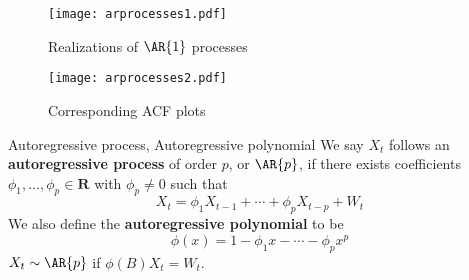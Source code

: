 \begin{figure}[!htbp]
    \centering
    \texttt{[image: arprocesses1.pdf]}
    \caption{Realizations of $ \AR{1} $ processes}\label{fig:arprocesses1}
\end{figure}
\begin{figure}[!htbp]
    \centering
    \texttt{[image: arprocesses2.pdf]}
    \caption{Corresponding ACF plots}\label{fig:arprocesses2}
\end{figure}
\begin{Definition}{Autoregressive process, Autoregressive polynomial}{}
    We say $ X_t $ follows an \textbf{autoregressive process} of order $ p $,
    or $ \AR{p} $,
    if there exists coefficients $ \phi_1,\ldots,\phi_p\in\mathbf{R} $
    with $ \phi_p\ne 0 $ such that
    \[ X_t=\phi_1X_{t-1}+\cdots+\phi_p X_{t-p}+W_t \]
    We also define the \textbf{autoregressive polynomial} to be
    \[ \phi(x)=1-\phi_1 x-\cdots-\phi_p x^p \]
    $ X_t\sim \AR{p} $ if $ \phi(B)X_t=W_t $.
\end{Definition}
